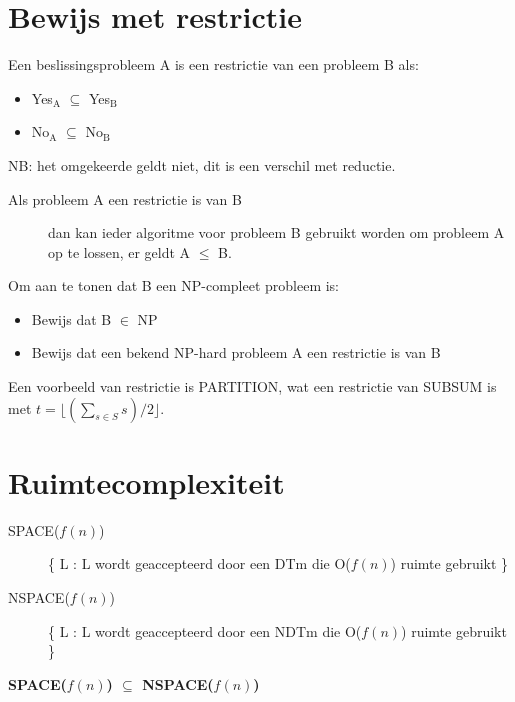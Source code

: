 \documentclass[]{article}
\begin{document}
\section*{Bewijs met restrictie}
Een beslissingsprobleem A is een restrictie van een probleem B als:

\begin{itemize}
\item Yes$_\text{A}$ $\subseteq$ Yes$_\text{B}$
\item No$_\text{A}$ $\subseteq$ No$_\text{B}$
\end{itemize}
NB: het omgekeerde geldt niet, dit is een verschil met reductie.

\begin{description}
\item[Als probleem A een restrictie is van B] dan kan ieder algoritme voor probleem B gebruikt worden om probleem A op te lossen, er geldt A $\leq$ B.
\end{description}

Om aan te tonen dat B een NP-compleet probleem is:

\begin{itemize}
\item Bewijs dat B $\in$ NP
\item Bewijs dat een bekend NP-hard probleem A een restrictie is van B
\end{itemize}

Een voorbeeld van restrictie is PARTITION, wat een restrictie van SUBSUM is met $t = \lfloor (\sum_{s \in S} s) / 2 \rfloor$.

\section*{Ruimtecomplexiteit}

\begin{description}
\item[SPACE($f(n)$)] \{ L : L wordt geaccepteerd door een DTm die O($f(n)$) ruimte gebruikt \}
\item[NSPACE($f(n)$)] \{ L : L wordt geaccepteerd door een NDTm die O($f(n)$) ruimte gebruikt \}
\end{description}

\medskip

\textbf{SPACE($f(n)$) $\subseteq$ NSPACE($f(n)$)}

\medskip
\end{document}
